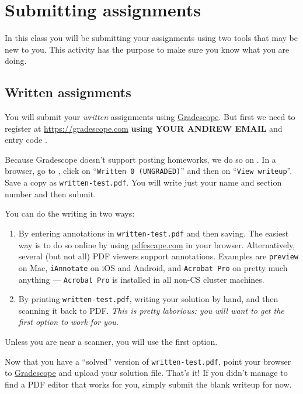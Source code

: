 \newpage
\section*{Submitting assignments}

In this class you will be submitting your assignments using two tools
that may be new to you.  This activity has the purpose to make sure
you know what you are doing.


\subsection*{Written assignments}
\begin{part}
You will submit your \emph{written} assignments using
\href{\gradescope}{Gradescope}.  But first we need to register at
\href{https://gradescope.com}{https://gradescope.com} \textbf{using
  YOUR ANDREW EMAIL} and entry code \textbf{\gradescopeEntryCode}.

Because Gradescope doesn't support posting homeworks, we do so on
\writtenDistributor{}.  In a browser, go to \writtenDistributor, click on %
``\lstinline'Written 0 (UNGRADED)''' and then on %
``\lstinline'View writeup'''.  Save a copy as \lstinline'written-test.pdf'.
You will write just your name and section number and then submit.

You can do the writing in two ways:
\begin{enumerate}
\item%
  By entering annotations in \lstinline'written-test.pdf' and then
  saving.  The easiest way is to do so online by using
  \url{pdfescape.com} in your browser.  Alternatively, several (but
  not all) PDF viewers support annotations.  Examples are
  \lstinline'preview' on Mac, \lstinline'iAnnotate' on iOS and
  Android, and \lstinline'Acrobat Pro' on pretty much anything ---
  \lstinline'Acrobat Pro' is installed in all non-CS cluster machines.

\item%
  By printing \lstinline'written-test.pdf', writing your solution by
  hand, and then scanning it back to PDF\@.  \emph{This is pretty
    laborious: you will want to get the first option to work for you.}
\end{enumerate}
Unless you are near a scanner, you will use the first option.

Now that you have a ``solved'' version of
\lstinline'written-test.pdf', point your browser to
\href{\gradescope}{Gradescope} and upload your solution file.  That's
it!  If you didn't manage to find a PDF editor that works for you,
simply submit the blank writeup for now.
\end{part}


